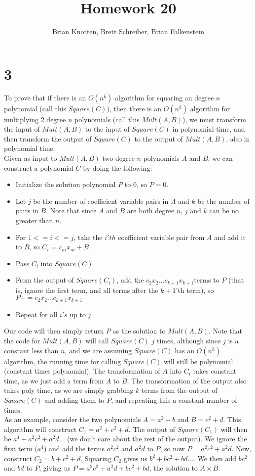 \documentclass[letterpaper,notitlepage,twoside]{article}
\begin{document}
\title{Homework 20}
\author{Brian Knotten, Brett Schreiber, Brian Falkenstein}
\maketitle
\section*{3}
To prove that if there is an $O(n^k)$ algorithm for squaring an degree $n$ polynomial (call this $Square(C)$), then there is an $O(n^k)$ algorithm for multiplying 2 degree $n$ polynomials (call this $Mult(A, B)$), we must transform the input of $Mult(A, B)$ to the input of $Square(C)$ in polynomial time, and then transform the output of $Square(C)$ to the output of $Mult(A, B)$, also in polynomial time. \\
Given as input to $Mult(A, B)$ two degree $n$ polynomials $A$ and $B$, we can construct a polynomial $C$ by doing the following: 
\begin{itemize}
\item Initialize the solution polynomial $P$ to 0, so $P=0$. 
\item Let $j$ be the number of coefficient variable pairs in $A$ and $k$ be the number of pairs in $B$. Note that since $A$ and $B$ are both degree $n$, $j$ and $k$ can be no greater than $n$. 
\item For $1<=i<=j$, take the $i'th$ coefficient variable pair from $A$ and add it to $B$, so $C_i$ = $c_{ai}x_{ai} + B$
\item Pass $C_i$ into $Square(C)$.
\item From the output of $Square(C_i)$, add the $c_2x_2 ... c_{k+1}x_{k+1}$terms to $P$ (that is, ignore the first term, and all terms after the $k+1$'th term), so $P+= c_2x_2...c_{k+1}x_{k+1}$
\item Repeat for all $i's$ up to $j$
\end{itemize}
Our code will then simply return $P$ as the solution to $Mult(A, B)$. Note that the code for $Mult(A, B)$ will call $Square(C)$ $j$ times, although since $j$ is a constant less than $n$, and we are assuming $Square(C)$ has an $O(n^k)$ algorithm, the running time for calling $Square(C)$ will still be polynomial (constant times polynomial). The transformation of $A$ into $C_i$ takes constant time, as we just add a term from $A$ to $B$. The transformation of the output also takes poly time, as we are simply grabbing $k$ terms from the output of $Square(C)$ and adding them to $P$, and repeating this a constant number of times. \\
As an example, consider the two polynomials $A=a^2 + b$ and $B = c^2 + d$. This algorithm will construct $C_1 = a^2 + c^2 + d$. The output of $Square(C_1)$ will then be $a^4 + a^2c^2 + a^2d...$ (we don't care about the rest of the output). We ignore the first term ($a^4$) and add the terms $a^2c^2$ and $a^2d$ to $P$, so now $P = a^2c^2 + a^2d$. Now, construct $C_2 = b + c^2 + d$. Squaring $C_2$ gives us $b^2 + bc^2 + bd ...$. We then add $bc^2$ and $bd$ to $P$, giving us $P=a^2c^2 + a^2d + bc^2 + bd$, the solution to $A\times B$. 
\end{document}
